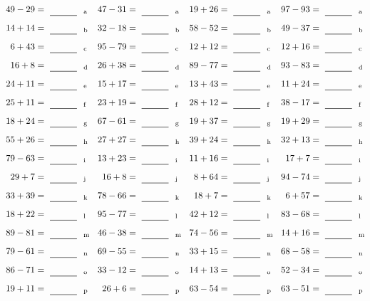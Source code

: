 \documentclass
[
  draft    = true,
  fontsize = 11pt,
  parskip  = half-
]
{scrartcl}
\begin{document}
\clearpage
\begin{align*}
    \pline{49-29}&=\rline{a}
  & \pline{47-31}&=\rline{a}
  & \pline{19+26}&=\rline{a}
  & \pline{97-93}&=\rline{a} \\[1ex]
    \pline{14+14}&=\rline{b}
  & \pline{32-18}&=\rline{b}
  & \pline{58-52}&=\rline{b}
  & \pline{49-37}&=\rline{b} \\[1ex]
    \pline{6+43}&=\rline{c}
  & \pline{95-79}&=\rline{c}
  & \pline{12+12}&=\rline{c}
  & \pline{12+16}&=\rline{c} \\[1ex]
    \pline{16+8}&=\rline{d}
  & \pline{26+38}&=\rline{d}
  & \pline{89-77}&=\rline{d}
  & \pline{93-83}&=\rline{d} \\[1ex]
    \pline{24+11}&=\rline{e}
  & \pline{15+17}&=\rline{e}
  & \pline{13+43}&=\rline{e}
  & \pline{11+24}&=\rline{e} \\[1ex]
    \pline{25+11}&=\rline{f}
  & \pline{23+19}&=\rline{f}
  & \pline{28+12}&=\rline{f}
  & \pline{38-17}&=\rline{f} \\[1ex]
    \pline{18+24}&=\rline{g}
  & \pline{67-61}&=\rline{g}
  & \pline{19+37}&=\rline{g}
  & \pline{19+29}&=\rline{g} \\[1ex]
    \pline{55+26}&=\rline{h}
  & \pline{27+27}&=\rline{h}
  & \pline{39+24}&=\rline{h}
  & \pline{32+13}&=\rline{h} \\[1ex]
    \pline{79-63}&=\rline{i}
  & \pline{13+23}&=\rline{i}
  & \pline{11+16}&=\rline{i}
  & \pline{17+7}&=\rline{i} \\[1ex]
    \pline{29+7}&=\rline{j}
  & \pline{16+8}&=\rline{j}
  & \pline{8+64}&=\rline{j}
  & \pline{94-74}&=\rline{j} \\[1ex]
    \pline{33+39}&=\rline{k}
  & \pline{78-66}&=\rline{k}
  & \pline{18+7}&=\rline{k}
  & \pline{6+57}&=\rline{k} \\[1ex]
    \pline{18+22}&=\rline{l}
  & \pline{95-77}&=\rline{l}
  & \pline{42+12}&=\rline{l}
  & \pline{83-68}&=\rline{l} \\[1ex]
    \pline{89-81}&=\rline{m}
  & \pline{46-38}&=\rline{m}
  & \pline{74-56}&=\rline{m}
  & \pline{14+16}&=\rline{m} \\[1ex]
    \pline{79-61}&=\rline{n}
  & \pline{69-55}&=\rline{n}
  & \pline{33+15}&=\rline{n}
  & \pline{68-58}&=\rline{n} \\[1ex]
    \pline{86-71}&=\rline{o}
  & \pline{33-12}&=\rline{o}
  & \pline{14+13}&=\rline{o}
  & \pline{52-34}&=\rline{o} \\[1ex]
    \pline{19+11}&=\rline{p}
  & \pline{26+6}&=\rline{p}
  & \pline{63-54}&=\rline{p}
  & \pline{63-51}&=\rline{p}
\end{align*}
\end{document}
